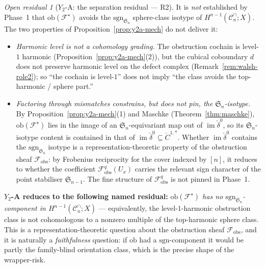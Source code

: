 \documentclass[11pt,oneside]{amsart}
\theoremstyle{plain}
\theoremstyle{definition}
\theoremstyle{remark}
\theoremstyle{honeststyle}
\newtheorem{openresidual}[theorem]{Open residual}
\newcommand{\F}{\mathcal{F}}
\newcommand{\Fstar}{\F^{\star}}
\newcommand{\sgn}{\mathrm{sgn}}
\newcommand{\Sym}{\mathfrak{S}}
\newcommand{\Cn}{\mathcal{C}^{\cap}_n}
\newcommand{\ob}{\mathrm{ob}}
\newcommand{\fobs}{\mathcal{F}_{\mathrm{obs}}}
\DeclareMathOperator{\im}{im}
\begin{document}
\begin{openresidual}[$Y_2$-A: the separation residual --- R2]
\label{res:y2}
It is \emph{not} established by Phase~1 that $\ob(\Fstar)$ avoids the
$\sgn_{\Sym_n}$ sphere-class isotype of $H^{n-1}(\Cn;X)$. The two
properties of Proposition~\ref{prop:y2a-mech} do not deliver it:
\begin{itemize}[leftmargin=1.5em]
\item \emph{Harmonic level is not a cohomology grading.} The
  obstruction cochain is level-$1$ harmonic
  (Proposition~\ref{prop:y2a-mech}(2)), but the cubical coboundary $d$
  does not preserve harmonic level on the defect complex
  (Remark~\ref{rem:walsh-role2}); so ``the cochain is level-$1$'' does
  not imply ``the class avoids the top-harmonic / sphere part.''
\item \emph{Factoring through mismatches constrains, but does not
  pin, the $\Sym_n$-isotype.} By
  Proposition~\ref{prop:y2a-mech}(1) and Maschke
  (Theorem~\ref{thm:maschke}), $\ob(\Fstar)$ lies in the image of an
  $\Sym_n$-equivariant map out of $\im\check\delta^{0}$, so its
  $\Sym_n$-isotype content is contained in that of
  $\im\check\delta^{0}\subseteq\check C^{1,*}$. Whether
  $\im\check\delta^{0}$ contains the $\sgn_{\Sym_n}$ isotype is a
  representation-theoretic property of the obstruction sheaf $\fobs$:
  by Frobenius reciprocity for the cover indexed by $[n]$, it reduces
  to whether the coefficient $\fobs^{q}(U_x)$ carries the relevant
  sign character of the point stabiliser $\Sym_{n-1}$. The fine
  structure of $\fobs^{q}$ is not pinned in Phase~1.
\end{itemize}
\textbf{$Y_2$-A reduces to the following named residual:}
\emph{$\ob(\Fstar)$ has no $\sgn_{\Sym_n}$-component in
$H^{n-1}(\Cn;X)$} --- equivalently, the level-$1$-harmonic obstruction
class is not cohomologous to a nonzero multiple of the
top-harmonic sphere class. This is a representation-theoretic question
about the obstruction sheaf $\fobs$, and it is naturally a
\emph{faithfulness} question: if $\ob$ had a $\sgn$-component it would
be partly the family-blind orientation class, which is the precise
shape of the wrapper-risk.
\end{openresidual}
\end{document}
